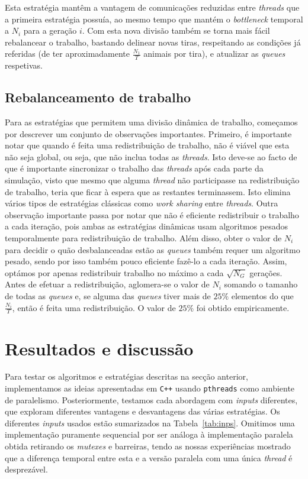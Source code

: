 \documentclass[10pt,a4paper,oneside]{article}
\begin{document}
Esta estratégia mantêm a vantagem de comunicações reduzidas entre
\textit{threads} que a primeira estratégia possuía, ao mesmo tempo que
mantém o \textit{bottleneck} temporal a $N_i$ para a geração $i$. Com
esta nova divisão também se torna mais fácil rebalancear o trabalho,
bastando delinear novas tiras, respeitando as condições já referidas
(de ter aproximadamente $\frac{N_1}{T}$ animais por tira), e atualizar
as \textit{queues} respetivas.

\subsection{Rebalanceamento de trabalho}
Para as estratégias que permitem uma divisão dinâmica de trabalho,
começamos por descrever um conjunto de observações
importantes. Primeiro, é importante notar que quando é feita uma
redistribuição de trabalho, não é viável que esta não seja global, ou
seja, que não inclua todas as \textit{threads}. Isto deve-se ao facto
de que é importante sincronizar o trabalho das \textit{threads} após
cada parte da simulação, visto que mesmo que alguma \textit{thread}
não participasse na redistribuição de trabalho, teria que ficar à
espera que as restantes terminassem. Isto elimina vários tipos de
estratégias clássicas como \textit{work sharing} entre
\textit{threads}. Outra observação importante passa por notar que não
é eficiente redistribuir o trabalho a cada iteração, pois ambas as
estratégias dinâmicas usam algoritmos pesados temporalmente para
redistribuição de trabalho. Além disso, obter o valor de $N_i$ para
decidir o quão desbalanceadas estão as \textit{queues} também requer
um algoritmo pesado, sendo por isso também pouco eficiente fazê-lo a
cada iteração. Assim, optámos por apenas redistribuir trabalho no
máximo a cada $\sqrt{N_G}$ gerações. Antes de efetuar a
redistribuição, aglomera-se o valor de $N_i$ somando o tamanho de
todas as \textit{queues} e, se alguma das \textit{queues} tiver mais de
$25\%$ elementos do que $\frac{N_i}{T}$, então é feita uma
redistribuição. O valor de $25\%$ foi obtido empiricamente.


\section{Resultados e discussão}
\label{sec:res}
Para testar os algoritmos e estratégias descritas na secção anterior,
implementamos as ideias apresentadas em \texttt{C++} usando
\texttt{pthreads} como ambiente de paralelismo. Posteriormente,
testamos cada abordagem com \textit{inputs} diferentes, que exploram
diferentes vantagens e desvantagens das várias estratégias. Os
diferentes \textit{inputs} usados estão sumarizados na
Tabela~\ref{tab:inps}. Omitimos uma implementação puramente sequencial
por ser análoga à implementação paralela obtida retirando os
\textit{mutexes} e barreiras, tendo as nossas experiências mostrado
que a diferença temporal entre esta e a versão paralela com uma única
\textit{thread} é desprezável.
\end{document}
